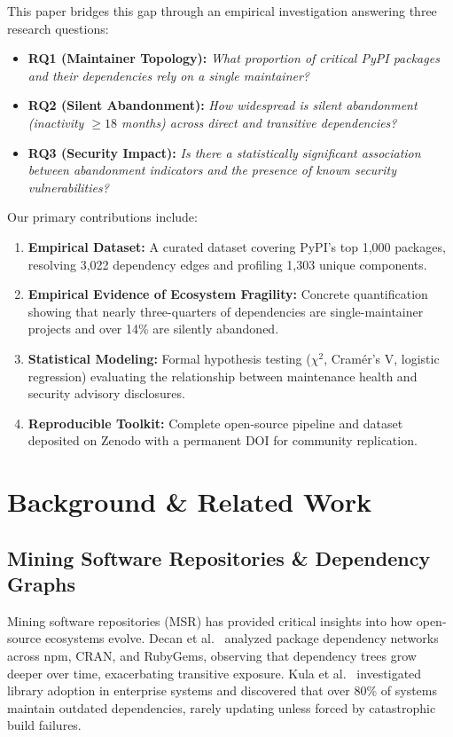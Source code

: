 \documentclass[conference]{IEEEtran}
\begin{document}
This paper bridges this gap through an empirical investigation answering three research questions:
\begin{itemize}
    \item \textbf{RQ1 (Maintainer Topology):} \textit{What proportion of critical PyPI packages and their dependencies rely on a single maintainer?}
    \item \textbf{RQ2 (Silent Abandonment):} \textit{How widespread is silent abandonment (inactivity $\ge 18$ months) across direct and transitive dependencies?}
    \item \textbf{RQ3 (Security Impact):} \textit{Is there a statistically significant association between abandonment indicators and the presence of known security vulnerabilities?}
\end{itemize}

Our primary contributions include:
\begin{enumerate}
    \item \textbf{Empirical Dataset:} A curated dataset covering PyPI's top 1,000 packages, resolving 3,022 dependency edges and profiling 1,303 unique components.
    \item \textbf{Empirical Evidence of Ecosystem Fragility:} Concrete quantification showing that nearly three-quarters of dependencies are single-maintainer projects and over 14\% are silently abandoned.
    \item \textbf{Statistical Modeling:} Formal hypothesis testing ($\chi^2$, Cram\'er's V, logistic regression) evaluating the relationship between maintenance health and security advisory disclosures.
    \item \textbf{Reproducible Toolkit:} Complete open-source pipeline and dataset deposited on Zenodo with a permanent DOI for community replication.
\end{enumerate}

\section{Background \& Related Work}

\subsection{Mining Software Repositories \& Dependency Graphs}

Mining software repositories (MSR) has provided critical insights into how open-source ecosystems evolve. Decan et al.~\cite{decan2019empirical} analyzed package dependency networks across npm, CRAN, and RubyGems, observing that dependency trees grow deeper over time, exacerbating transitive exposure. Kula et al.~\cite{kula2018developers} investigated library adoption in enterprise systems and discovered that over 80\% of systems maintain outdated dependencies, rarely updating unless forced by catastrophic build failures.
\end{document}
